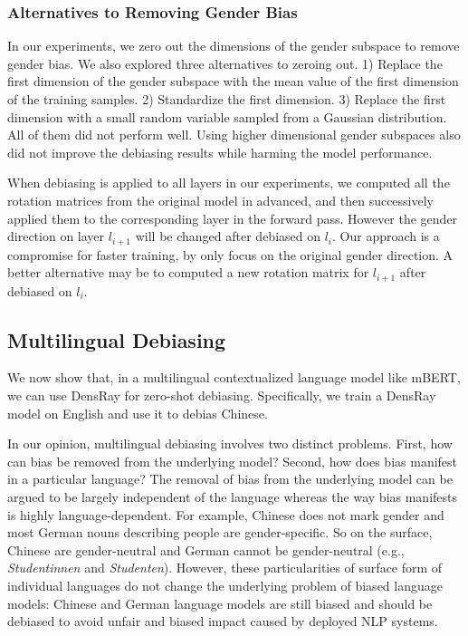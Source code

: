 \subsubsection*{Alternatives to Removing Gender Bias}
In our experiments, we zero out the dimensions of the gender
subspace to remove gender bias. 
We also explored three alternatives to zeroing out. 1)
Replace the first dimension of the gender subspace with the
mean value of the first dimension of the training
samples. 2) Standardize the first dimension. 3) Replace the
first dimension with a small random variable sampled from a Gaussian distribution. All of them did not perform well. Using higher dimensional gender subspaces also did not improve the debiasing results while harming the model performance.

When debiasing is applied to all layers in our experiments, we computed all the rotation matrices from the original model in advanced, and then successively applied them to the corresponding layer in the forward pass. However the gender direction on layer $l_{i+1}$ will be changed after debiased on $l_i$. Our approach is a compromise for faster training, by only focus on the original gender direction. A better alternative may be to computed a new rotation matrix for $l_{i+1}$ after debiased on $l_i$.


\subsection{Multilingual Debiasing}
We now show that, in a multilingual contextualized language model like mBERT, we can use DensRay for zero-shot debiasing. Specifically, we train a DensRay model on English and use it to debias Chinese.

In our opinion, multilingual debiasing involves two distinct
	problems. First, how can bias be removed from the underlying
	model? Second, how does bias manifest in a particular
	language? The removal of bias from the underlying model can
	be argued to be largely independent of the language whereas
	the way bias manifests is highly language-dependent. For
	example, Chinese does not mark gender and most German nouns
	describing people are gender-specific. So on the surface,
	Chinese are gender-neutral and German
	cannot be gender-neutral (e.g., \textit{Studentinnen} and \textit{Studenten}). However, these particularities of surface form of individual
	languages do not change the underlying problem of biased
	language models: Chinese and German language models are
	still biased and should be debiased to avoid unfair and
	biased impact caused by deployed NLP systems.
	
